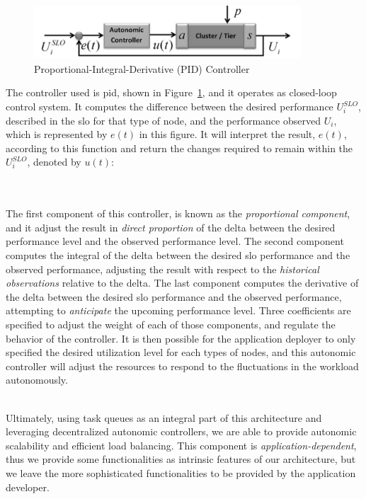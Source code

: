 \documentclass[12pt, titlepage]{uo_temp}
\begin{document}
     \begin{figure}[h]
       \includegraphics[width=100mm]{./images/self_optimization-PID.png}
       \caption{Proportional-Integral-Derivative (PID) Controller
         \cite{gergin2014decentralized}}
       \label{pid_fig}
     \end{figure}
     
     The controller used is \gls{pid}, shown in Figure~\ref{pid_fig}, and it operates as
     closed-loop control system. It computes the difference between the desired
     performance $U^{SLO}_i$, described in the \gls{slo} for that type of node, and the
     performance observed $U_i$, which is represented by $e(t)$ in this figure. It will
     interpret the result, $e(t)$, according to this function and return the changes
     required to remain within the $U^{SLO}_i$, denoted by $u(t)$:

     \\  \\

     The first component of this controller, is known as the \emph{proportional component}, and
     it adjust the result in \emph{direct proportion} of the delta between the desired
     performance level and the observed performance level.  The second component computes
     the integral of the delta between the desired \gls{slo} performance and the observed
     performance, adjusting the result with respect to the \emph{historical observations}
     relative to the delta. The last component computes the derivative of the delta
     between the desired \gls{slo} performance and the observed performance, attempting to
     \emph{anticipate} the upcoming performance level. Three coefficients are specified to adjust
     the weight of each of those components, and regulate the behavior of the
     controller. It is then possible for the application deployer to only specified the
     desired utilization level for each types of nodes, and this autonomic controller will
     adjust the resources to respond to the fluctuations in the workload autonomously. 
     
     \\ Ultimately, using task queues as an integral part of this architecture and
     leveraging decentralized autonomic controllers, we are able to provide autonomic
     scalability and efficient load balancing. This component is
     \emph{application-dependent}, thus we provide some functionalities as intrinsic
     features of our architecture, but we leave the more sophisticated functionalities to
     be provided by the application developer. 
     
\end{document}
